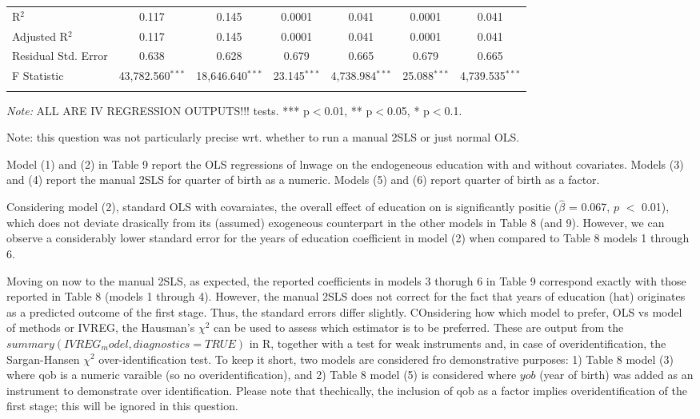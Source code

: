 \documentclass[a4paper]{article}
\begin{document}
\begin{table}[!htbp]
\begin{adjustwidth}{0.cm}{-0cm}
\begin{threeparttable}
\begin{tabular}{@{\extracolsep{-5pt}}lcccccc}
R$^{2}$ & 0.117 & 0.145 & 0.0001 & 0.041 & 0.0001 & 0.041 \\ 
Adjusted R$^{2}$ & 0.117 & 0.145 & 0.0001 & 0.041 & 0.0001 & 0.041 \\ 
Residual Std. Error & 0.638 & 0.628 & 0.679 & 0.665  & 0.679& 0.665  \\ 
F Statistic & 43,782.560$^{***}$ & 18,646.640$^{***}$  & 23.145$^{***}$  & 4,738.984$^{***}$ & 25.088$^{***}$ & 4,739.535$^{***}$ \\ 
\hline 
\hline \\[-3.5ex] 
\end{tabular} 
\begin{tablenotes}
      \small
      \item\textit{Note:} ALL ARE IV REGRESSION OUTPUTS!!! tests. *** p$<$0.01, ** p$<$0.05, * p$<$0.1.
    \end{tablenotes}
\end{threeparttable}
\end{adjustwidth}
%
\end{table}
Note: this question was not particularly precise wrt. whether to run a manual 2SLS or just normal OLS.

Model (1) and (2) in Table 9 report the OLS regressions of lnwage on the endogeneous education with and without covariates. Models (3) and (4) report the manual 2SLS for quarter of birth as a numeric. Models (5) and (6) report quarter of birth as a factor. 

\indent Considering model (2), standard OLS with covaraiates, the overall effect of education on is significantly positie ($\hat{\beta}$ = 0.067, $p$ $<$ 0.01), which does not deviate drasically from its (assumed) exogeneous counterpart in the other models in Table 8 (and 9). However, we can observe a considerably lower standard error for the years of education coefficient in model (2) when compared to Table 8 models 1 through 6.

\indent Moving on now to the manual 2SLS, as expected, the reported coefficients in models 3 thorugh 6 in Table 9 correspond exactly with those reported in Table 8 (models 1 through 4). However, the manual 2SLS does not correct for the fact that years of education (hat) originates as a predicted outcome of the first stage. Thus, the standard errors differ slightly.
\indent COnsidering how which model to prefer, OLS vs model of methods or IVREG, the Hausman's ${\chi}^2$ can be used to assess which estimator is to be preferred. These are output from the $summary(IVREG_model, diagnostics = TRUE)$ in R, together with a test for weak instruments and, in case of overidentification, the Sargan-Hansen ${\chi}^2$ over-identification test. To keep it short, two models are considered fro demonstrative purposes: 1) Table 8 model (3) where qob is a numeric varaible (so no overidentification), and 2) Table 8 model (5) is considered where $yob$ (year of birth) was added as an instrument to demonstrate over identification. Please note that thechically, the inclusion of qob as a factor implies overidentification of the first stage; this will be ignored in this question.
\end{document}
